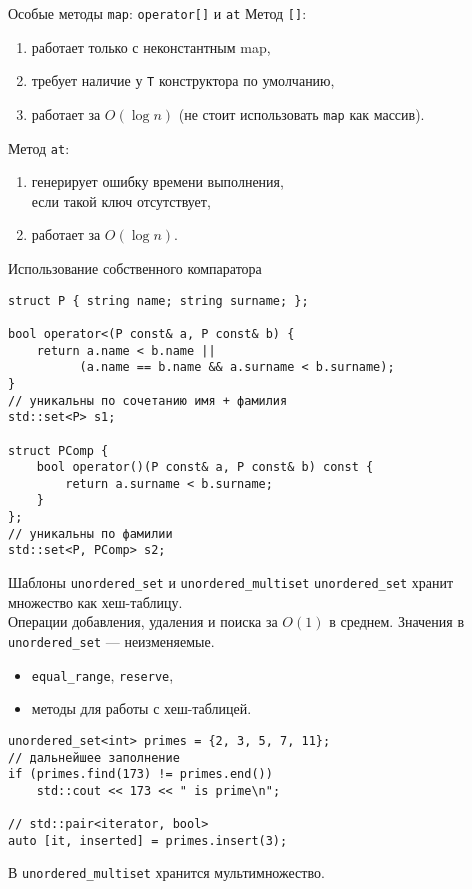 \documentclass{beamer}
\begin{document}
\begin{frame}[fragile]{Особые методы {\tt map}: {\tt operator[]} и {\tt at}}
Метод {\tt {}[]}:
\begin{enumerate}
    \item работает только с неконстантным map,
    \item требует наличие у {\tt T} конструктора по умолчанию,
    \item работает за $O(\log n)$
    (не стоит использовать {\tt map} как массив).
\end{enumerate}
Метод {\tt at}:
\begin{enumerate}
    \item генерирует ошибку времени выполнения,\\
         если такой ключ отсутствует,
    \item работает за $O(\log n)$.
\end{enumerate}
\end{frame}

\begin{frame}[fragile]{Использование собственного компаратора}
\begin{lstlisting}
struct P { string name; string surname; };

bool operator<(P const& a, P const& b) {
    return a.name < b.name || 
          (a.name == b.name && a.surname < b.surname);
}
// уникальны по сочетанию имя + фамилия
std::set<P> s1;

struct PComp {
    bool operator()(P const& a, P const& b) const {
        return a.surname < b.surname;
    }
};
// уникальны по фамилии
std::set<P, PComp> s2;
\end{lstlisting}
\end{frame}


\begin{frame}[fragile]{Шаблоны {\tt unordered\_set} и {\tt unordered\_multiset}}
\texttt{unordered\_set} хранит множество как хеш-таблицу.\\ 
Операции добавления, удаления и поиска за $O(1)$ в среднем.
Значения в \texttt{unordered\_set} — неизменяемые.
\begin{itemize}
	\item {\tt equal\_range}, {\tt reserve},
	\item методы для работы с хеш-таблицей.
\end{itemize}\vspace{-1mm}

\begin{lstlisting}
unordered_set<int> primes = {2, 3, 5, 7, 11};
// дальнейшее заполнение
if (primes.find(173) != primes.end())
    std::cout << 173 << " is prime\n";
    
// std::pair<iterator, bool>
auto [it, inserted] = primes.insert(3);
\end{lstlisting}
В \texttt{unordered\_multiset} хранится мультимножество.
\end{frame}
\end{document}
